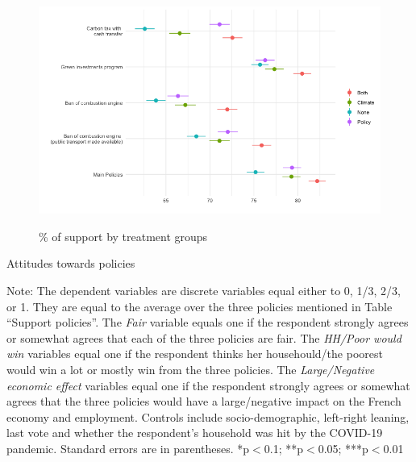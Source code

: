 	\begin{frame}{}%
	\begin{figure}[h!]
	\caption{\% of support by treatment groups} %
	\includegraphics[width=.7\paperwidth]{../figures/country_comparison/support_var_by_treatment_all.png} \\
	\end{figure}
	\end{frame}
	
	\begin{frame}{}%
	\begin{table}[h!]
	\caption{Attitudes towards policies}
	\begin{center}
	\scalebox{.7}{}
	\end{center}
		{\scriptsize Note: The dependent variables are discrete variables equal either to 0, 1/3, 2/3, or 1. They are equal to the average over the three policies mentioned in Table ``Support policies''. The \textit{Fair} variable equals one if the respondent strongly agrees or somewhat agrees that each of the three policies are fair. The \textit{HH/Poor would win} variables equal one if the respondent thinks her househould/the poorest would win a lot or mostly win from the three policies. The \textit{Large/Negative economic effect} variables equal one if the respondent strongly agrees or somewhat agrees that the three policies would have a large/negative impact on the French economy and employment. 
		\newline Controls include socio-demographic, left-right leaning, last vote and whether the respondent's household was hit by the COVID-19 pandemic. Standard errors are in parentheses. *p$<$0.1; **p$<$0.05; ***p$<$0.01}
	\end{table}
	\end{frame}


